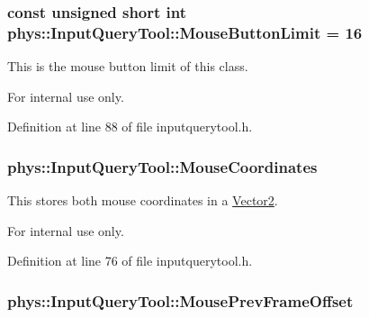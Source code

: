 \hypertarget{classphys_1_1InputQueryTool_af5d261bc351f43222db511aacf572409}{
\subsubsection[{MouseButtonLimit}]{\setlength{\rightskip}{0pt plus 5cm}const unsigned short int {\bf phys::InputQueryTool::MouseButtonLimit} = 16}}
\label{da/d96/classphys_1_1InputQueryTool_af5d261bc351f43222db511aacf572409}


This is the mouse button limit of this class. 

\begin{DoxyInternal}{For internal use only.}
\end{DoxyInternal}


Definition at line 88 of file inputquerytool.h.

\hypertarget{classphys_1_1InputQueryTool_a379f40bdfb0cbafb84d1dcf297cb1ea3}{
\subsubsection[{MouseCoordinates}]{ {\bf phys::InputQueryTool::MouseCoordinates}}}
\label{da/d96/classphys_1_1InputQueryTool_a379f40bdfb0cbafb84d1dcf297cb1ea3}


This stores both mouse coordinates in a \hyperlink{classphys_1_1Vector2}{Vector2}. 

\begin{DoxyInternal}{For internal use only.}
\end{DoxyInternal}


Definition at line 76 of file inputquerytool.h.

\hypertarget{classphys_1_1InputQueryTool_af0e34b7565836f2ebbb15b0d37d10718}{
\subsubsection[{MousePrevFrameOffset}]{ {\bf phys::InputQueryTool::MousePrevFrameOffset}}}
\label{da/d96/classphys_1_1InputQueryTool_af0e34b7565836f2ebbb15b0d37d10718}


